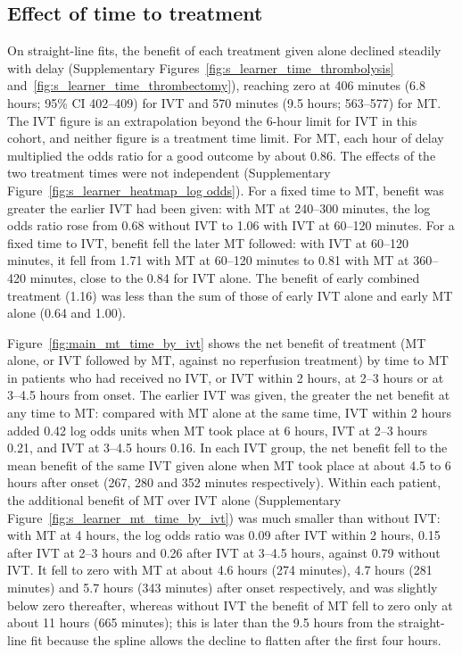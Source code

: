 \subsection{Effect of time to treatment}

On straight-line fits, the benefit of each treatment given alone declined steadily with delay (Supplementary Figures~\ref{fig:s_learner_time_thrombolysis} and~\ref{fig:s_learner_time_thrombectomy}), reaching zero at 406 minutes (6.8 hours; 95\% CI 402--409) for IVT and 570 minutes (9.5 hours; 563--577) for MT. The IVT figure is an extrapolation beyond the 6-hour limit for IVT in this cohort, and neither figure is a treatment time limit. For MT, each hour of delay multiplied the odds ratio for a good outcome by about 0.86. The effects of the two treatment times were not independent (Supplementary Figure~\ref{fig:s_learner_heatmap_log odds}). For a fixed time to MT, benefit was greater the earlier IVT had been given: with MT at 240--300 minutes, the log odds ratio rose from 0.68 without IVT to 1.06 with IVT at 60--120 minutes. For a fixed time to IVT, benefit fell the later MT followed: with IVT at 60--120 minutes, it fell from 1.71 with MT at 60--120 minutes to 0.81 with MT at 360--420 minutes, close to the 0.84 for IVT alone. The benefit of early combined treatment (1.16) was less than the sum of those of early IVT alone and early MT alone (0.64 and 1.00).

Figure~\ref{fig:main_mt_time_by_ivt} shows the net benefit of treatment (MT alone, or IVT followed by MT, against no reperfusion treatment) by time to MT in patients who had received no IVT, or IVT within 2 hours, at 2--3 hours or at 3--4.5 hours from onset. The earlier IVT was given, the greater the net benefit at any time to MT: compared with MT alone at the same time, IVT within 2 hours added 0.42 log odds units when MT took place at 6 hours, IVT at 2--3 hours 0.21, and IVT at 3--4.5 hours 0.16. In each IVT group, the net benefit fell to the mean benefit of the same IVT given alone when MT took place at about 4.5 to 6 hours after onset (267, 280 and 352 minutes respectively). Within each patient, the additional benefit of MT over IVT alone (Supplementary Figure~\ref{fig:s_learner_mt_time_by_ivt}) was much smaller than without IVT: with MT at 4 hours, the log odds ratio was 0.09 after IVT within 2 hours, 0.15 after IVT at 2--3 hours and 0.26 after IVT at 3--4.5 hours, against 0.79 without IVT. It fell to zero with MT at about 4.6 hours (274 minutes), 4.7 hours (281 minutes) and 5.7 hours (343 minutes) after onset respectively, and was slightly below zero thereafter, whereas without IVT the benefit of MT fell to zero only at about 11 hours (665 minutes); this is later than the 9.5 hours from the straight-line fit because the spline allows the decline to flatten after the first four hours.

